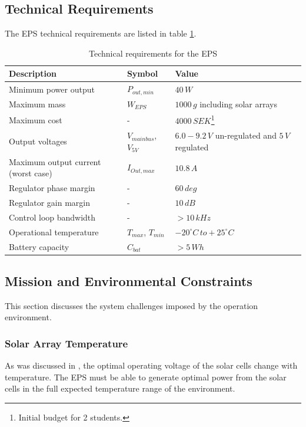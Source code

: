 \subsection{Technical Requirements}
The \ac{EPS} technical requirements are listed in table \ref{tab:technical_requirements}.
%
\begin{table}[H]
\centering
\caption{Technical requirements for the \ac{EPS}}
\label{tab:technical_requirements}
\begin{minipage}{\textwidth}
\begin{tabular}{p{}p{}p{}}
\hline
\textbf{Description} & \textbf{Symbol} & \textbf{Value}\\
\hline
Minimum power output & $P_{out,min}$ & $40\,W$\\
Maximum mass & $W_{EPS}$ & $1000\,g$ including solar arrays\\
Maximum cost & - & $4000\,SEK$\footnote{Initial budget for 2 students.}\\
Output voltages & $V_{mainbus}$, $V_{5V}$ & $6.0-9.2\,V$ un-regulated and $5\,V$ regulated\\
Maximum output current (worst case) & $I_{Out,max}$ & $10.8\,A$\\
Regulator phase margin & - & $60\,deg$\\
Regulator gain margin & - & $10\,dB$\\
Control loop bandwidth & - & $>10\,kHz$\\
Operational temperature & $T_{max}$, $T_{min}$ & $-20^{\circ}C\,to +25^{\circ}C$\\
Battery capacity & $C_{bat}$ & $>5\,Wh$\\
\hline
\end{tabular}\par
\vspace{-0.75\skip\footins}
\renewcommand{\footnoterule}{}
\end{minipage}
\end{table}

\subsection{Mission and Environmental Constraints}
\label{subsec:environmental_requirements}
This section discusses the system challenges imposed by the operation environment.

\subsubsection*{Solar Array Temperature}
As was discussed in \cite{PDR}, the optimal operating voltage of the solar cells change with temperature. The \ac{EPS} must be able to generate optimal power from the solar cells in the full expected temperature range of the environment.

